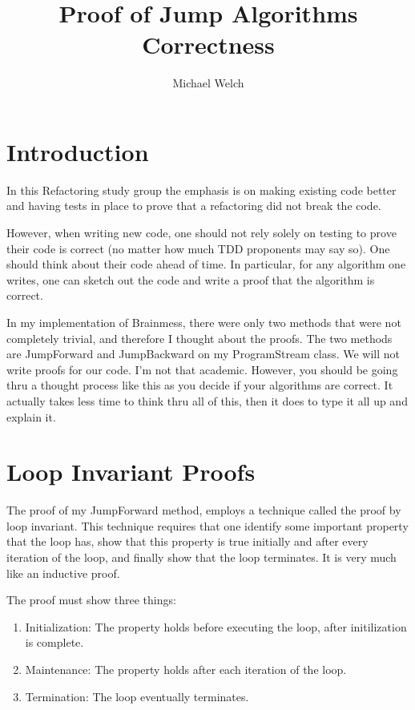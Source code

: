 \documentclass[10pt]{article}
\begin{document}
\title{Proof of Jump Algorithms Correctness}
\author{Michael Welch}
\maketitle

\section*{Introduction}
In this Refactoring study group the emphasis is on making existing code
better and having tests in place to prove that a refactoring did not
break the code.

However, when writing new code, one should not rely solely on testing
to prove their code is correct (no matter how much TDD proponents may say
so). One should think about their code ahead of time. In particular,
for any algorithm one writes, one can sketch out
the code and write a proof that the algorithm is correct.

In my implementation of Brainmess, there were only two methods that
were not completely trivial, and therefore I thought about the proofs.
The two methods are JumpForward and JumpBackward on my ProgramStream
class. We will not write proofs for our code. I'm not that academic.
However, you should be going thru a thought process like this as you decide
if your algorithms are correct. It actually takes less time to think 
thru all of this, then it does to type it all up and explain it.

\section*{Loop Invariant Proofs}
The proof of my JumpForward method, employs a technique called the
proof by loop invariant. This technique requires that one
identify some important property that the loop has, show that this
property is true initially and after every iteration of the loop,
and finally show that the loop terminates. It is very
much like an inductive proof.

The proof must show three things:

\begin{enumerate}
\item Initialization: The property holds before executing the loop, after initilization is complete.

\item Maintenance: The property holds after each iteration of the loop.

\item Termination: The loop eventually terminates.
\end{enumerate}
\end{document}
